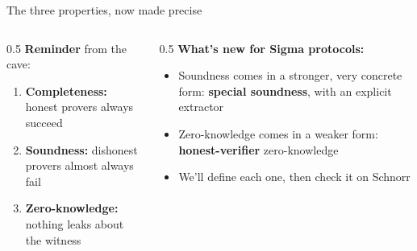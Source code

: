 \ifdefined\PRESENTATION\else\PassOptionsToClass{handout}{beamer}\fi\documentclass[aspectratio=169, lualatex]{beamer}
\begin{document}
\begin{frame}{The three properties, now made precise}
	\begin{columns}[c]
		\begin{column}{0.5\textwidth}
			\textbf{Reminder} from the cave:
			\begin{enumerate}
				\item \textbf{Completeness:} honest provers always succeed
				\item \textbf{Soundness:} dishonest provers almost always fail
				\item \textbf{Zero-knowledge:} nothing leaks about the witness
			\end{enumerate}
		\end{column}
		\begin{column}{0.5\textwidth}
			\textbf{What's new for Sigma protocols:}
			\begin{itemize}
				\item Soundness comes in a stronger, very concrete form: \textbf{special soundness}, with an explicit extractor
				\item Zero-knowledge comes in a weaker form: \textbf{honest-verifier} zero-knowledge
				\item We'll define each one, then check it on Schnorr
			\end{itemize}
		\end{column}
	\end{columns}
\end{frame}
\end{document}
